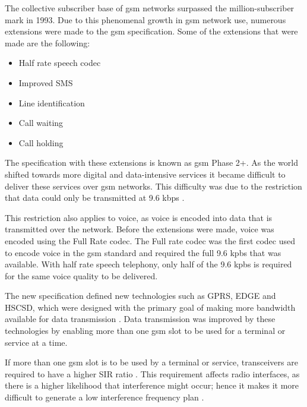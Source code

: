 The collective subscriber base of \gls{gsm} networks surpassed the million-subscriber mark in 1993\cite{GSM92}. Due to this phenomenal growth in \gls{gsm} network use, numerous extensions were made to the \gls{gsm} specification. 
Some of the extensions that were made are the following\cite{GSM92,GSMArchitectureProtocolsServices}:
\begin{itemize}
\item Half rate speech codec
\item Improved SMS
\item Line identification
\item Call waiting
\item Call holding
\end{itemize}
The specification with these extensions is known as \gls{gsm} Phase 2+. As the world shifted towards more digital and data-intensive services it became difficult to deliver these services over \gls{gsm} networks. This difficulty was due to the restriction that data could only be transmitted at 9.6 kbps \cite{GSM92,Karen2004}. 

This restriction also applies to voice, as voice is encoded into data that is transmitted over the network\cite{Karen2004, GSM92}. Before the extensions were made, voice was encoded using the Full Rate codec\cite{GSMArchitectureProtocolsServices}. The Full rate codec was the first codec used to encode voice in the \gls{gsm} standard and required the full 9.6 kpbs that was available\cite{GSMArchitectureProtocolsServices}. With half rate speech telephony, only half of the 9.6 kpbs is required for the same voice quality to be delivered\cite{GSMArchitectureProtocolsServices}.  

The new specification defined new technologies such as GPRS, EDGE and HSCSD, which were designed with the primary goal of making more bandwidth available for data transmission \cite{GSMArchitectureProtocolsServices,Karen2004}. Data transmission was improved by these technologies by enabling more than one \gls{gsm} slot to be used for a terminal or service at a time\cite{GSMArchitectureProtocolsServices,Karen2004}.

If more than one \gls{gsm} slot is to be used by a terminal or service, transceivers are required to have a higher \gls{SIR} ratio \cite{GSMArchitectureProtocolsServices,GSMSysEngin}. This requirement affects radio interfaces, as there is a higher likelihood that interference might occur; hence it makes it more difficult to generate a low interference frequency plan \cite{Eisenblatter,GSMSysEngin}. 

